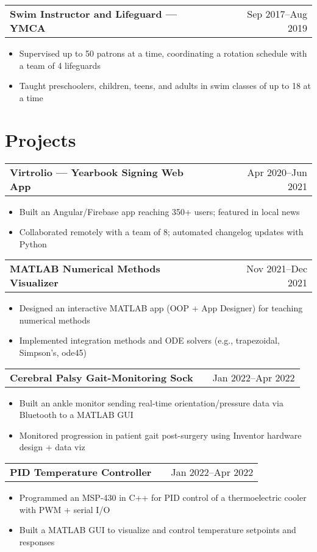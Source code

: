 \documentclass[a4paper,12pt]{article}
\makeatletter
\newenvironment{joblong}[2]
    {
    \begin{tabularx}{\linewidth}{@{}l X r@{}}
    \textbf{#1} & \hfill &  #2 \\[3.75pt]
    \end{tabularx}
    \begin{minipage}[t]{\linewidth}
    \begin{itemize}[nosep,after=\strut, leftmargin=1em, itemsep=3pt,label=--]
    }
    {
    \end{itemize}
    \end{minipage}    
    }
\makeatother
\begin{document}
\begin{joblong}{Swim Instructor and Lifeguard — YMCA}{Sep 2017--Aug 2019}
\item Supervised up to 50 patrons at a time, coordinating a rotation schedule with a team of 4 lifeguards
\item Taught preschoolers, children, teens, and adults in swim classes of up to 18 at a time
\end{joblong}
  
\section{Projects}

\begin{joblong}{Virtrolio — Yearbook Signing Web App}{Apr 2020--Jun 2021}
\item Built an Angular/Firebase app reaching 350+ users; featured in local news
\item Collaborated remotely with a team of 8; automated changelog updates with Python
\end{joblong}

\begin{joblong}{MATLAB Numerical Methods Visualizer}{Nov 2021--Dec 2021}
\item Designed an interactive MATLAB app (OOP + App Designer) for teaching numerical methods
\item Implemented integration methods and ODE solvers (e.g., trapezoidal, Simpson’s, ode45)
\end{joblong}

\begin{joblong}{Cerebral Palsy Gait-Monitoring Sock}{Jan 2022--Apr 2022}
\item Built an ankle monitor sending real-time orientation/pressure data via Bluetooth to a MATLAB GUI
\item Monitored progression in patient gait post-surgery using Inventor hardware design + data viz
\end{joblong}

\begin{joblong}{PID Temperature Controller}{Jan 2022--Apr 2022}
\item Programmed an MSP-430 in C++ for PID control of a thermoelectric cooler with PWM + serial I/O
\item Built a MATLAB GUI to visualize and control temperature setpoints and responses
\end{joblong}
\end{document}
